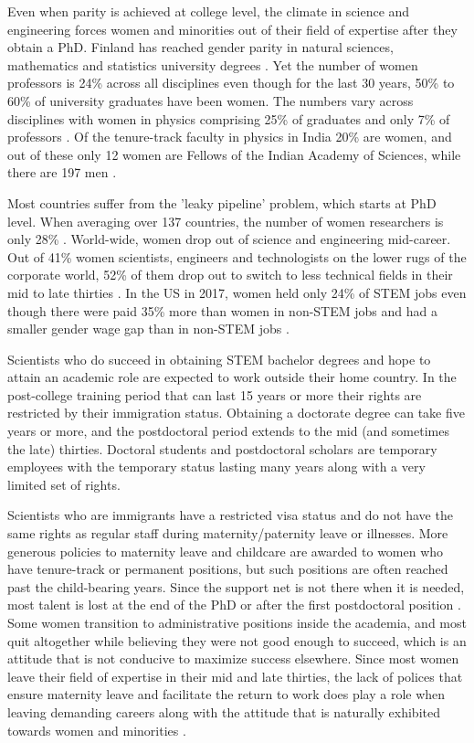 \documentclass[utf8]{frontiersSCNS} %
\begin{document}
Even when parity is achieved at college level, the climate in science and engineering forces women and minorities out of their field of expertise after they obtain a PhD. Finland has reached gender parity in natural sciences, mathematics and statistics university degrees \citep{FinlandStats}. Yet the number of women professors is 24\% across all disciplines even though for the last 30 years, 50\% to 60\% of university graduates have been women. The numbers vary across disciplines with women in physics comprising 25\% of graduates and only 7\% of professors \citep{banzuzi2013women}. Of the tenure-track faculty in physics in India 20\% are women, and out of these only 12 women are Fellows of the Indian Academy of Sciences, while there are 197 men \citep{WiredIndiaFaculty}.

Most countries suffer from the 'leaky pipeline' problem, which starts at PhD level. When averaging over 137 countries, the number of women researchers is only 28\% \citep{huyer2015gender}. World-wide,  women drop out of science and engineering mid-career. Out of 41\% women scientists, engineers and technologists on the lower rugs of the corporate world, 52\% of them drop out to switch to less technical fields in their mid to late thirties \citep{hewlett2008athena}. In the US in 2017, women held only 24\% of STEM jobs even though there were paid 35\% more than women in non-STEM jobs and had a smaller gender wage gap than in non-STEM jobs \citep{womenSTEM}.

Scientists who do succeed in obtaining STEM bachelor degrees and hope to attain an academic role are expected to work outside their home country. In the post-college training period that can last 15 years or more their rights are restricted by their immigration status. Obtaining a doctorate degree can take five years or more, and the postdoctoral period extends to the mid (and sometimes the late) thirties. Doctoral students and postdoctoral scholars are temporary employees with the temporary status lasting many years along with a very limited set of rights. 

Scientists who are immigrants have a restricted visa status and do not have the same rights as regular staff during maternity/paternity leave or illnesses.   More generous policies to maternity leave and childcare are awarded to women who have tenure-track or permanent positions, but such positions are often reached past the child-bearing years. Since the support net is not there when it is needed, most talent is lost at the end of the PhD or after the first postdoctoral position \citep{huyer2015gender}. Some women transition to administrative positions inside the academia, and most quit altogether while believing they were not good enough to succeed, which is an attitude that is not conducive to maximize success elsewhere. Since most women leave their field of expertise in their mid and late thirties, the lack of polices that ensure maternity leave and facilitate the return to work does play a role when leaving demanding careers \citep{rangel2018factors} along with the attitude that is naturally exhibited towards women and minorities \citep{national2018sexual}.  
\end{document}
